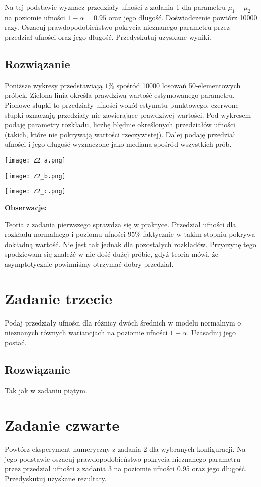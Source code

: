 \documentclass[a4paper]{article}
\begin{document}
Na tej podstawie wyznacz przedziały ufności z zadania 1 dla parametru $\mu_1-\mu_2$ na poziomie ufności $1-\alpha=0.95$ oraz jego długość. Doświadczenie powtórz 10000 razy. Oszacuj prawdopodobieństwo pokrycia nieznanego parametru przez przedział ufności oraz jego długość. Przedyskutuj uzyskane wyniki.

\subsection{Rozwiązanie}
Poniższe wykresy przedstawiają $1\%$ spośród 10000 losowań 50-elementowych próbek. Zielona linia określa prawdziwą wartość estymowanego parametru. Pionowe słupki to przedziały ufności wokół estymatu punktowego, czerwone słupki oznaczają przedziały nie zawierające prawdziwej wartości. Pod wykresem podaję parametry rozkładu, liczbę błędnie określonych przedziałów ufności (takich, które nie pokrywają wartości rzeczywistej). Dalej podaję przedział ufności i jego długość wyznaczone jako mediana spośród wszystkich prób.

\texttt{[image: Z2\_a.png]}

\texttt{[image: Z2\_b.png]}

\texttt{[image: Z2\_c.png]}

\textbf{Obserwacje:}

Teoria z zadania pierwszego sprawdza się w praktyce. Przedział ufności dla rozkładu normalnego i poziomu ufności $95\%$ faktycznie w takim stopniu pokrywa dokładną wartość. Nie jest tak jednak dla pozostałych rozkładów. Przyczynę tego spodziewam się znaleźć w nie dość dużej próbie, gdyż teoria mówi, że asymptotycznie powinniśmy otrzymać dobry przedział.

\section{Zadanie trzecie}
Podaj przedziały ufności dla różnicy dwóch średnich w modelu normalnym o nieznanych równych wariancjach na poziomie ufności $1-\alpha$. Uzasadnij jego postać.

\subsection{Rozwiązanie}
Tak jak w zadaniu piątym.

\section{Zadanie czwarte}
Powtórz eksperyment numeryczny z zadania 2 dla wybranych konfiguracji. Na jego podstawie oszacuj prawdopodobieństwo pokrycia nieznanego parametru przez przedział ufności z zadania 3 na poziomie ufności 0.95 oraz jego długość. Przedyskutuj uzyskane rezultaty.
\end{document}
